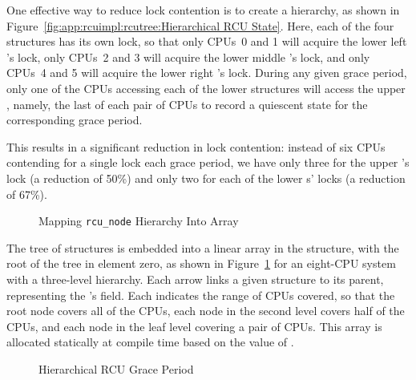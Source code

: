 One effective way to reduce lock contention is to create a hierarchy,
as shown in
Figure~\ref{fig:app:rcuimpl:rcutree:Hierarchical RCU State}.
Here, each of the four  structures has its own lock,
so that only CPUs~0 and 1 will acquire the lower left
's lock, only CPUs~2 and 3 will acquire the
lower middle 's lock, and only CPUs~4 and 5
will acquire the lower right 's lock.
During any given grace period,
only one of the CPUs accessing each of the lower 
structures will access the upper , namely, the
last of each pair of CPUs to record a quiescent state for the corresponding
grace period.

This results in a significant reduction in lock contention:
instead of six CPUs contending for a single lock each grace period,
we have only three for the upper 's lock
(a reduction of 50\%) and only
two for each of the lower s' locks (a reduction
of 67\%).

\begin{figure}[htb]
\centering
{}
\caption{Mapping {\tt rcu\_node} Hierarchy Into Array}
\label{fig:app:rcuimpl:rcutree:Mapping rcu-node Hierarchy Into Array}
\end{figure}

The tree of  structures is embedded into
a linear array in the  structure,
with the root of the tree in element zero, as shown in
Figure~\ref{fig:app:rcuimpl:rcutree:Mapping rcu-node Hierarchy Into Array}
for an eight-CPU
system with a three-level hierarchy.
Each arrow links a given  structure to its parent,
representing the 's  field.
Each  indicates the range of CPUs covered,
so that the root node covers all of the CPUs, each node in the second
level covers half of the CPUs, and each node in the leaf level covering
a pair of CPUs.
This array is allocated statically at compile time based on the value
of .

\begin{figure}[htbp]
\centering
{}
\caption{Hierarchical RCU Grace Period}
\label{fig:app:rcuimpl:rcutree:Hierarchical RCU Grace Period}
\end{figure}

